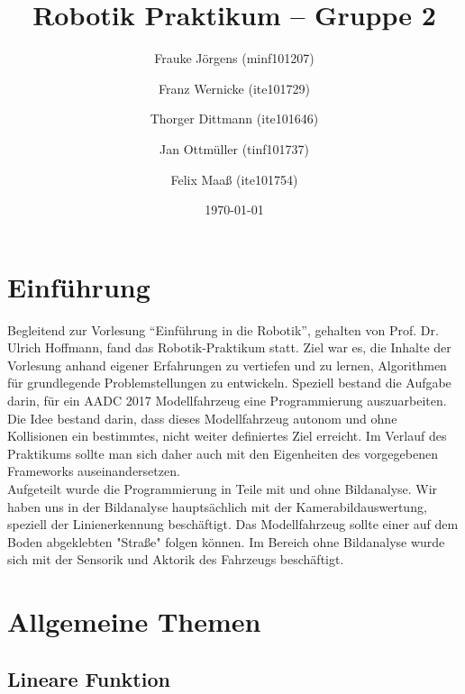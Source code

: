 \documentclass[a4paper,12pt]{report}
\begin{document}

	\title{Robotik Praktikum -- Gruppe 2}
	\author{Frauke Jörgens (minf101207) \and Franz Wernicke (ite101729) \and Thorger Dittmann (ite101646) \and Jan Ottmüller (tinf101737) \and Felix Maaß (ite101754)}
	\date{\today}
	\maketitle

	\tableofcontents



\chapter{Einführung}

Begleitend zur Vorlesung ``Einführung in die Robotik'', gehalten von Prof. Dr. Ulrich Hoffmann, fand das Robotik-Praktikum statt. Ziel war es, die Inhalte der Vorlesung anhand eigener Erfahrungen zu vertiefen und zu lernen, Algorithmen für grundlegende Problemstellungen zu entwickeln. Speziell bestand die Aufgabe darin, für ein AADC 2017 Modellfahrzeug eine Programmierung auszuarbeiten. Die Idee bestand darin, dass dieses Modellfahrzeug autonom und ohne Kollisionen ein bestimmtes, nicht weiter definiertes Ziel erreicht. Im Verlauf des Praktikums sollte man sich daher auch mit den Eigenheiten des vorgegebenen Frameworks auseinandersetzen.\\
Aufgeteilt wurde die Programmierung in Teile mit und ohne Bildanalyse. Wir haben uns in der Bildanalyse hauptsächlich mit der Kamerabildauswertung, speziell der Linienerkennung beschäftigt. Das Modellfahrzeug sollte einer auf dem Boden abgeklebten "Straße" folgen können. Im Bereich ohne Bildanalyse wurde sich mit der Sensorik und Aktorik des Fahrzeugs beschäftigt.\\

\chapter{Allgemeine Themen}
\section{Lineare Funktion}

\end{document}
